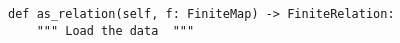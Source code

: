 \begin{verbatim}
def as_relation(self, f: FiniteMap) -> FiniteRelation:
    """ Load the data  """
\end{verbatim}